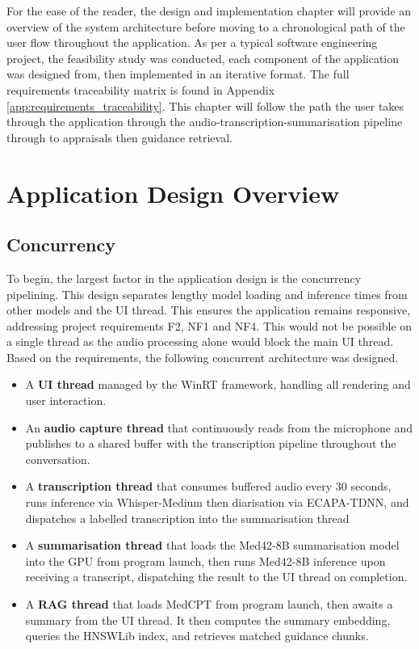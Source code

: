 For the ease of the reader, the design and implementation chapter will provide an overview of the system architecture before moving to a chronological path of the user flow throughout the application. As per a typical software engineering project, the feasibility study was conducted, each component of the application was designed from, then implemented in an iterative format. The full requirements traceability matrix is found in Appendix \ref{app:requirements_traceability}. This chapter will follow the path the user takes through the application through the audio-transcription-summarisation pipeline through to appraisals then guidance retrieval.

\section{Application Design Overview}
\subsection{Concurrency}
To begin, the largest factor in the application design is the concurrency pipelining. This design separates lengthy model loading and inference times from other models and the UI thread. This ensures the application remains responsive, addressing project requirements F2, NF1 and NF4. This would not be possible on a single thread as the audio processing alone would block the main UI thread. Based on the requirements, the following concurrent architecture was designed.

\begin{itemize}
    \item A \textbf{UI thread} managed by the WinRT framework, handling all rendering and user interaction.
    \item An \textbf{audio capture thread} that continuously reads from the microphone and publishes to a shared buffer with the transcription pipeline throughout the conversation.
    \item A \textbf{transcription thread} that consumes buffered audio every 30 seconds, runs inference via Whisper-Medium then diarisation via ECAPA-TDNN, and dispatches a labelled transcription into the summarisation thread
    \item A \textbf{summarisation thread} that loads the Med42-8B summarisation model into the GPU from program launch, then runs Med42-8B inference upon receiving a transcript, dispatching the result to the UI thread on completion.
    \item A \textbf{RAG thread} that loads MedCPT from program launch, then awaits a summary from the UI thread. It then computes the summary embedding, queries the HNSWLib index, and retrieves matched guidance chunks.
\end{itemize}

